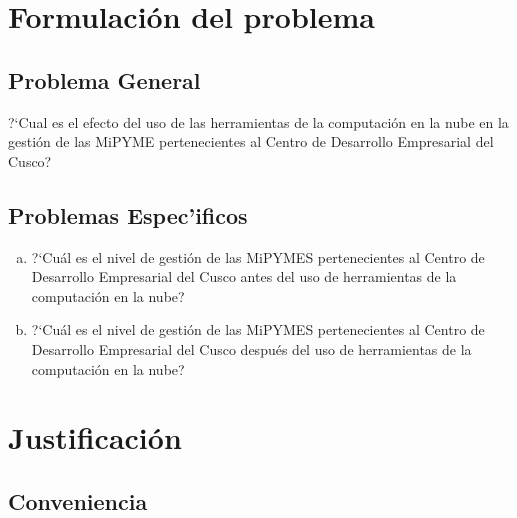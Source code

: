 \section{Formulación del problema}
\subsection{Problema General}
?`Cual es el efecto del uso de las herramientas de la computación en la nube
en la gestión de las MiPYME pertenecientes al Centro de Desarrollo Empresarial
del Cusco?
\subsection{Problemas Espec'ificos}
\begin{enumerate}[a.]
\item ?`Cuál es el nivel de gestión de las MiPYMES pertenecientes al Centro
de Desarrollo Empresarial del Cusco antes del uso de herramientas de la computación
en la nube?
\item ?`Cuál es el nivel de gestión de las MiPYMES pertenecientes al Centro
de Desarrollo Empresarial del Cusco después del uso de herramientas de la computación
en la nube?
\end{enumerate}

%
\section{Justificación}
\subsection{Conveniencia}

